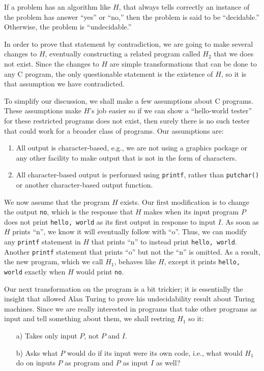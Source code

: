 \documentclass[]{article}
\begin{document}
    If a problem has an algorithm like $H$, that always tells correctly an 
    instance of the problem has answer ``yes'' or ``no,'' then the problem is
    said to be ``decidable.'' Otherwise, the problem is ``undecidable.''
    
    In order to prove that statement by contradiction, we are going to make
    several changes to $H$, eventually constructing a related program called
    $H_2$ that we does not exist. Since the changes to $H$ are simple
    transformations that can be done to any C program, the only questionable
    statement is the existence of $H$, so it is that assumption we have
    contradicted.
    
    To simplify our discussion, we shall make a few assumptions about C 
    programs. These assumptions make $H$'s job easier so if we can show a
    ``hello-world tester'' for these restricted programs does not exist, then
    surely there is no such tester that could work for a broader class of 
    programs. Our assumptions are:
      \begin{enumerate}
        \item All output is character-based, e.g., we are not using a graphics
        package or any other facility to make output that is not in the form of
        characters.
        \item All character-based output is performed using \texttt{printf},
        rather than \texttt{putchar()} or another character-based output 
        function. 
      \end{enumerate}
      
    We now assume that the program $H$ exists. Our first modification is to 
    change the output \texttt{no}, which is the response that $H$ makes when
    its input program $P$ does not print \texttt{hello, world} as its first 
    output in response to input $I$. As soon as $H$ prints ``n'', we know it 
    will eventually follow with ``o''. Thus, we can modify any \texttt{printf}
    statement in $H$ that prints ``n'' to instead print \texttt{hello, world}.
    Another \texttt{printf} statement that prints ``o'' but not the ``n'' is
    omitted. As a result, the new program, which we call $H_1$, behaves like 
    $H$, except it prints \texttt{hello, world} exactly when $H$ would print
    \texttt{no}.
    
    Our next transformation on the program is a bit trickier; it is essentially
    the insight that allowed Alan Turing to prove his undecidability result 
    about Turing machines. Since we are really interested in programs that take
    other programs as input and tell something about them, we shall restring
    $H_1$ so it:
      \begin{enumerate}
        \item[a)] Takes only input $P$, not $P$ and $I$.
        \item[b)] Asks what $P$ would do if its input were its own code, i.e.,
        what would $H_1$ do on inputs $P$ as program and $P$ as input $I$ as 
        well?
      \end{enumerate}
      
\end{document}

